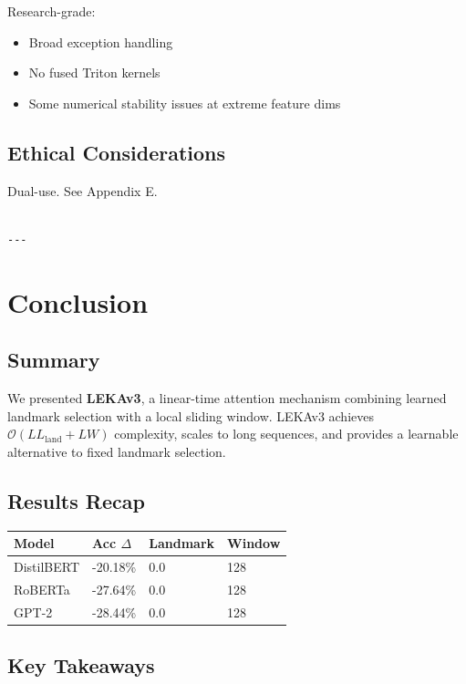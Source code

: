 Research-grade:
\begin{itemize}
\item Broad exception handling
\item No fused Triton kernels
\item Some numerical stability issues at extreme feature dims

\end{itemize}
\subsection{Ethical Considerations}

Dual-use. See Appendix E.
\begin{lstlisting}

---
\end{lstlisting}

\section{Conclusion}

\subsection{Summary}

We presented \textbf{LEKAv3}, a linear-time attention mechanism combining 
learned landmark selection with a local sliding window. LEKAv3 achieves 
$\mathcal{O}(L L_\text{land} + L W)$ complexity, scales to long sequences, 
and provides a learnable alternative to fixed landmark selection.

\subsection{Results Recap}

\begin{table}[H]
\centering
\small
\begin{tabular}{llll}
\toprule
\textbf{Model} & \textbf{Acc $\Delta$} & \textbf{Landmark} & \textbf{Window} \\
\midrule
DistilBERT & -20.18\% & 0.0 & 128 \\
RoBERTa & -27.64\% & 0.0 & 128 \\
GPT-2 & -28.44\% & 0.0 & 128 \\
\bottomrule
\end{tabular}
\end{table}

\subsection{Key Takeaways}

